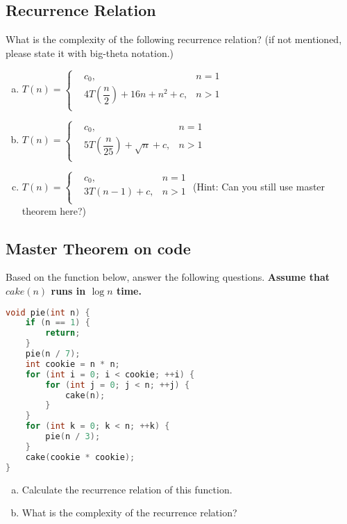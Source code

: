 \documentclass[11pt]{exam}
\begin{document}
\subsection{Recurrence Relation}
What is the complexity of the following recurrence relation? (if not mentioned, please state it with big-theta notation.)
\begin{enumerate}[(a)]

\item $T(n) = \left\{
\begin{aligned}
&c_0, &n=1\\
&4T\left(\dfrac{n}{2}\right)+16n+n^2+c, &n>1\\
\end{aligned}
\right.
$

\begin{solution}
\end{solution}

\item $T(n) = \left\{
\begin{aligned}
&c_0, &n=1\\
&5T\left(\dfrac{n}{25}\right)+\sqrt{n}+c, &n>1\\
\end{aligned}
\right.
$

\begin{solution}
\end{solution}

\item $T(n) = \left\{
\begin{aligned}
&c_0, &n=1\\
&3T(n-1)+c, &n>1\\
\end{aligned}
\right.
$ (Hint: Can you still use master theorem here?)
\begin{solution}
\end{solution}
\end{enumerate}

\subsection{Master Theorem on code}
Based on the function below, answer the following questions. \textbf{Assume that $cake(n)$ runs in $\log n$ time.}
\begin{lstlisting}[language=c++]
void pie(int n) {
	if (n == 1) {
		return;
	}
	pie(n / 7);
	int cookie = n * n;
	for (int i = 0; i < cookie; ++i) {
		for (int j = 0; j < n; ++j) {
			cake(n);
		}
	}
	for (int k = 0; k < n; ++k) {
		pie(n / 3);
	}
	cake(cookie * cookie);
}
\end{lstlisting}
\begin{enumerate}[(a)]
\item Calculate the recurrence relation of this function.
\item What is the complexity of the recurrence relation?

\end{enumerate}
\begin{solution}
\end{solution}
\end{document}
